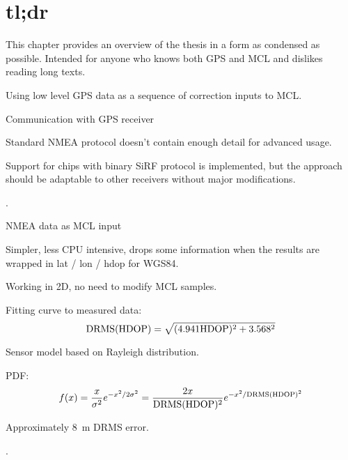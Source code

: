 \chapter{tl;dr}
This chapter provides an overview of the thesis in a form as condensed as possible.
Intended for anyone who knows both GPS and MCL and dislikes reading long texts.

\begin{compactitem}
\item
Using low level GPS data as a sequence of correction inputs to MCL.

\item
Communication with GPS receiver
\begin{compactitem}
    \item Standard NMEA protocol doesn't contain enough detail for advanced usage.
    \item Support for \sirf chips with binary SiRF protocol is implemented, but the
    approach should be adaptable to other receivers without major modifications.
    \item {}.
\end{compactitem}

\item
NMEA data as MCL input
\begin{compactitem}
    \item Simpler, less CPU intensive, drops some information when the results are
    wrapped in lat / lon / hdop for WGS84.
    \item Working in 2D, no need to modify MCL samples.
    \item
        Fitting curve to measured data:
        \begin{equation*}
            \mathrm{DRMS}(\mathrm{HDOP}) = \sqrt{(\num{4.941}\mathrm{HDOP})^2 + \num{3.568}^2}
        \end{equation*}
    \item Sensor model based on Rayleigh distribution.
    \item PDF:
        \begin{equation*}
            f(x) = \frac{x}{\sigma^2}e^{-x^2/2\sigma^2} =
            \frac{2x}{\mathrm{DRMS}(\mathrm{HDOP})^2}e^{-x^2/\mathrm{DRMS}(\mathrm{HDOP})^2}
        \end{equation*}
    \item Approximately \SI{8}{\meter} DRMS error.
    \item {}.
\end{compactitem}


\end{compactitem}
